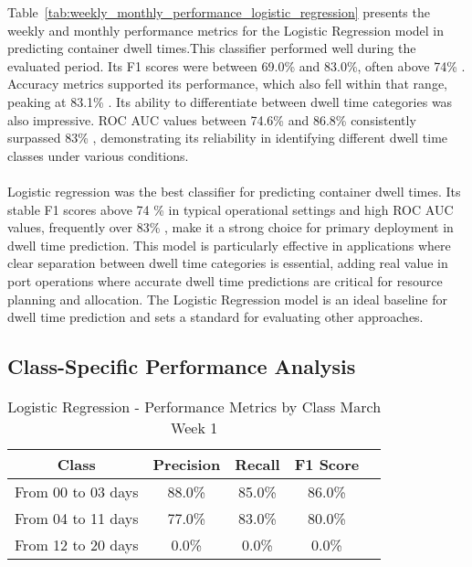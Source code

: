 			Table~\ref{tab:weekly_monthly_performance_logistic_regression}
			presents the weekly and monthly performance metrics for the Logistic Regression model in predicting
			container dwell times.This classifier performed well during the evaluated period. Its F1
			scores were between 69.0\% and 83.0\%, often above 74\%
			. Accuracy metrics supported its performance, which also fell within that range, peaking at 83.1\%
			. Its ability to differentiate between dwell time categories was also impressive. ROC AUC values
			between
			74.6\% and 86.8\% consistently surpassed 83\%
			, demonstrating its reliability in identifying different dwell time classes under various conditions.
			\\
			\\
			Logistic regression was the best classifier for predicting container dwell times. Its stable F1 scores
			above
			74
			\% in typical operational settings and high ROC AUC values, frequently over 83\%
			, make it a strong choice for primary deployment in dwell time prediction. This model is particularly
			effective in applications where clear separation between dwell time categories is essential, adding
			real value in port operations where accurate dwell time predictions are critical for resource planning and
			allocation. The Logistic Regression model is an ideal baseline for dwell time prediction and sets a
			standard for evaluating other approaches.

		\subsection{Class-Specific Performance Analysis}
			\begin{table}[H]
				\centering
				\begin{tabular}{|c|c|c|c|c|}
					\hline
					\textbf{Class} & \textbf{Precision} & \textbf{Recall} & \textbf{F1 Score} \\
					\hline
					From 00 to 03 days  & 88.0\%             & 85.0\%          & 86.0\%            \\
					\hline
					From 04 to 11 days  & 77.0\%             & 83.0\%          & 80.0\%            \\
					\hline
					From 12 to 20 days  & 0.0\%              & 0.0\%           & 0.0\%             \\
					\hline
				\end{tabular}
				\caption{Logistic Regression - Performance Metrics by Class March Week 1}
				\label{tab:performance_by_class_logistic_regression}
			\end{table}

